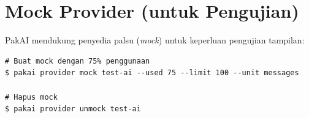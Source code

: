 \section{Mock Provider (untuk Pengujian)}

PakAI mendukung penyedia palsu (\textit{mock}) untuk keperluan pengujian tampilan:

\begin{lstlisting}[style=terminal]
# Buat mock dengan 75% penggunaan
$ pakai provider mock test-ai --used 75 --limit 100 --unit messages

# Hapus mock
$ pakai provider unmock test-ai
\end{lstlisting}
